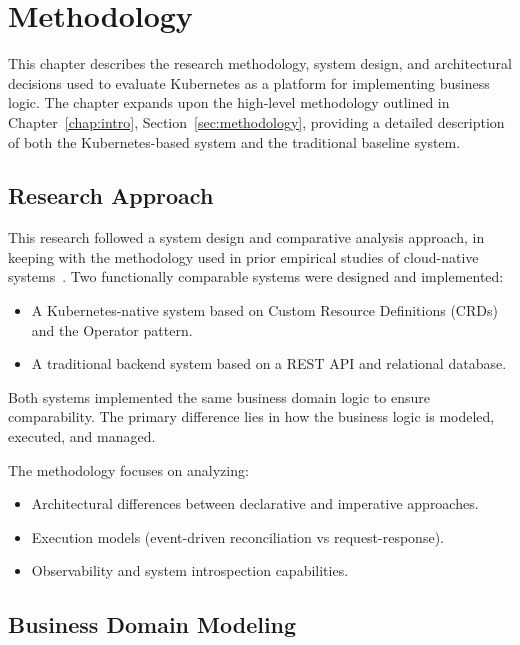 \chapter{Methodology}\label{chap:met}

This chapter describes the research methodology, system design, and architectural decisions used to evaluate Kubernetes as a platform for implementing business logic. The chapter expands upon the high-level methodology outlined in Chapter~\ref{chap:intro}, Section~\ref{sec:methodology}, providing a detailed description of both the Kubernetes-based system and the traditional baseline system.

\section{Research Approach}

This research followed a system design and comparative analysis approach, in keeping with the methodology used in prior empirical studies of cloud-native systems~\cite{bermbach2017benchmarking, kubernetes_multivocal_review}. Two functionally comparable systems were designed and implemented:

\begin{itemize}
    \item A Kubernetes-native system based on Custom Resource Definitions (CRDs) and the Operator pattern.
    \item A traditional backend system based on a REST API and relational database.
\end{itemize}

Both systems implemented the same business domain logic to ensure comparability. The primary difference lies in how the business logic is modeled, executed, and managed.

The methodology focuses on analyzing:
\begin{itemize}
    \item Architectural differences between declarative and imperative approaches.
    \item Execution models (event-driven reconciliation vs request-response).
    \item Observability and system introspection capabilities.
\end{itemize}

\section{Business Domain Modeling}

